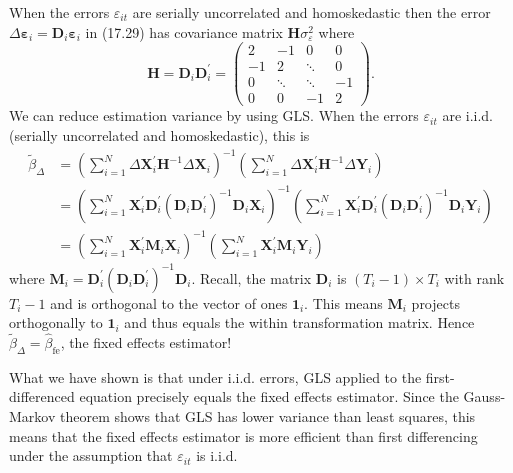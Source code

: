 \documentclass[10pt]{article}
\begin{document}
When the errors $\varepsilon_{i t}$ are serially uncorrelated and homoskedastic then the error $\Delta \boldsymbol{\varepsilon}_{i}=\boldsymbol{D}_{i} \boldsymbol{\varepsilon}_{i}$ in (17.29) has covariance matrix $\boldsymbol{H} \sigma_{\varepsilon}^{2}$ where
$$
\boldsymbol{H}=\boldsymbol{D}_{i} \boldsymbol{D}_{i}^{\prime}=\left(\begin{array}{cccc}
2 & -1 & 0 & 0 \\
-1 & 2 & \ddots & 0 \\
0 & \ddots & \ddots & -1 \\
0 & 0 & -1 & 2
\end{array}\right) .
$$
We can reduce estimation variance by using GLS. When the errors $\varepsilon_{i t}$ are i.i.d. (serially uncorrelated and homoskedastic), this is
$$
\begin{aligned}
\widetilde{\beta}_{\Delta} &=\left(\sum_{i=1}^{N} \Delta \boldsymbol{X}_{i}^{\prime} \boldsymbol{H}^{-1} \Delta \boldsymbol{X}_{i}\right)^{-1}\left(\sum_{i=1}^{N} \Delta \boldsymbol{X}_{i}^{\prime} \boldsymbol{H}^{-1} \Delta \boldsymbol{Y}_{i}\right) \\
&=\left(\sum_{i=1}^{N} \boldsymbol{X}_{i}^{\prime} \boldsymbol{D}_{i}^{\prime}\left(\boldsymbol{D}_{i} \boldsymbol{D}_{i}^{\prime}\right)^{-1} \boldsymbol{D}_{i} \boldsymbol{X}_{i}\right)^{-1}\left(\sum_{i=1}^{N} \boldsymbol{X}_{i}^{\prime} \boldsymbol{D}_{i}^{\prime}\left(\boldsymbol{D}_{i} \boldsymbol{D}_{i}^{\prime}\right)^{-1} \boldsymbol{D}_{i} \boldsymbol{Y}_{i}\right) \\
&=\left(\sum_{i=1}^{N} \boldsymbol{X}_{i}^{\prime} \boldsymbol{M}_{i} \boldsymbol{X}_{i}\right)^{-1}\left(\sum_{i=1}^{N} \boldsymbol{X}_{i}^{\prime} \boldsymbol{M}_{i} \boldsymbol{Y}_{i}\right)
\end{aligned}
$$
where $\boldsymbol{M}_{i}=\boldsymbol{D}_{i}^{\prime}\left(\boldsymbol{D}_{i} \boldsymbol{D}_{i}^{\prime}\right)^{-1} \boldsymbol{D}_{i}$. Recall, the matrix $\boldsymbol{D}_{i}$ is $\left(T_{i}-1\right) \times T_{i}$ with rank $T_{i}-1$ and is orthogonal to the vector of ones $\mathbf{1}_{i}$. This means $\boldsymbol{M}_{i}$ projects orthogonally to $\mathbf{1}_{i}$ and thus equals the within transformation matrix. Hence $\widetilde{\beta}_{\Delta}=\widehat{\beta}_{\mathrm{fe}}$, the fixed effects estimator!

What we have shown is that under i.i.d. errors, GLS applied to the first-differenced equation precisely equals the fixed effects estimator. Since the Gauss-Markov theorem shows that GLS has lower variance than least squares, this means that the fixed effects estimator is more efficient than first differencing under the assumption that $\varepsilon_{i t}$ is i.i.d.
\end{document}
